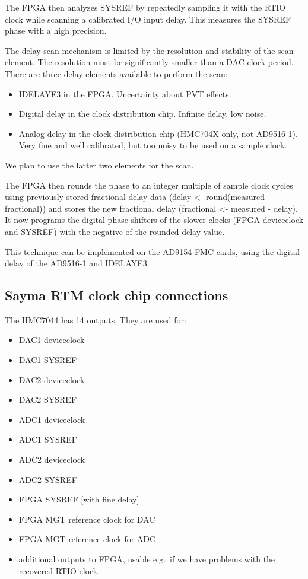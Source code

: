 The FPGA then analyzes SYSREF by repeatedly sampling it with the RTIO
clock while scanning a calibrated I/O input delay. This measures the
SYSREF phase with a high precision.

The delay scan mechanism is limited by the resolution and stability of
the scan element. The resolution must be significantly smaller than a
DAC clock period. There are three delay elements available to perform
the scan:

\begin{itemize}

	\item
	IDELAYE3 in the FPGA. Uncertainty about PVT effects.
	\item
	Digital delay in the clock distribution chip. Infinite delay, low
	noise.
	\item
	Analog delay in the clock distribution chip (HMC704X only, not
	AD9516-1). Very fine and well calibrated, but too noisy to be used on
	a sample clock.
\end{itemize}

We plan to use the latter two elements for the scan.

The FPGA then rounds the phase to an integer multiple of sample clock
cycles using previously stored fractional delay data (delay \textless{}-
round(measured - fractional)) and stores the new fractional delay
(fractional \textless{}- measured - delay). It now programs the digital
phase shifters of the slower clocks (FPGA deviceclock and SYSREF) with
the negative of the rounded delay value.

This technique can be implemented on the AD9154 FMC cards, using the
digital delay of the AD9516-1 and IDELAYE3.

\subsection{Sayma RTM clock chip
	connections}\label{sayma-rtm-clock-chip-connections}

The HMC7044 has 14 outputs. They are used for:

\begin{itemize}

	\item
	DAC1 deviceclock
	\item
	DAC1 SYSREF
	\item
	DAC2 deviceclock
	\item
	DAC2 SYSREF
	\item
	ADC1 deviceclock
	\item
	ADC1 SYSREF
	\item
	ADC2 deviceclock
	\item
	ADC2 SYSREF
	\item
	FPGA SYSREF {[}with fine delay{]}
	\item
	FPGA MGT reference clock for DAC
	\item
	FPGA MGT reference clock for ADC
	\item
	additional outputs to FPGA, usable e.g.~if we have problems with the
	recovered RTIO clock.
\end{itemize}

